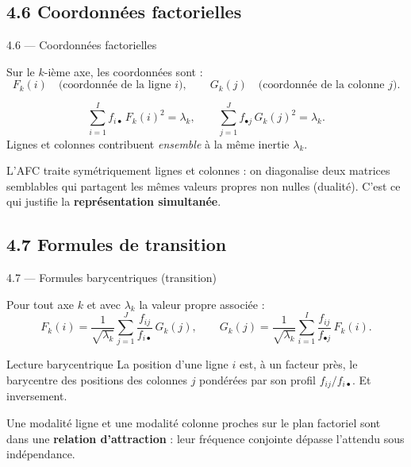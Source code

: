 \subsection{4.6 Coordonnées factorielles}
\begin{frame}{4.6 — Coordonnées factorielles}
\begin{definition}
Sur le $k$-ième axe, les coordonnées sont :
\[
F_k(i) \quad\text{(coordonnée de la ligne } i\text{)}, \qquad
G_k(j) \quad\text{(coordonnée de la colonne } j\text{)}.
\]
\end{definition}

\begin{theorem}
\[
\sum_{i=1}^I f_{i\bullet}\, F_k(i)^2 = \lambda_k,
\qquad
\sum_{j=1}^J f_{\bullet j}\, G_k(j)^2 = \lambda_k.
\]
Lignes et colonnes contribuent \emph{ensemble} à la même inertie $\lambda_k$.
\end{theorem}

\begin{rema}
\small L'AFC traite \alert{symétriquement} lignes et colonnes : on diagonalise
deux matrices semblables qui partagent les mêmes valeurs propres non nulles
(dualité). C'est ce qui justifie la \textbf{représentation simultanée}.
\end{rema}
\end{frame}

\subsection{4.7 Formules de transition}
\begin{frame}{4.7 — Formules barycentriques (transition)}
\begin{theorem}
Pour tout axe $k$ et avec $\lambda_k$ la valeur propre associée :
\[
\boxed{\;
F_k(i) = \frac{1}{\sqrt{\lambda_k}}
         \sum_{j=1}^J \frac{f_{ij}}{f_{i\bullet}}\, G_k(j),
\qquad
G_k(j) = \frac{1}{\sqrt{\lambda_k}}
         \sum_{i=1}^I \frac{f_{ij}}{f_{\bullet j}}\, F_k(i).
\;}
\]
\end{theorem}

\begin{block}{Lecture barycentrique}
\small La position d'une ligne $i$ est, à un facteur près, le \alert{barycentre}
des positions des colonnes $j$ pondérées par son profil $f_{ij}/f_{i\bullet}$.
Et inversement.
\end{block}

\begin{rema}
\small Une modalité ligne et une modalité colonne \alert{proches} sur le plan
factoriel sont dans une \textbf{relation d'attraction} : leur fréquence
conjointe dépasse l'attendu sous indépendance.
\end{rema}
\end{frame}

